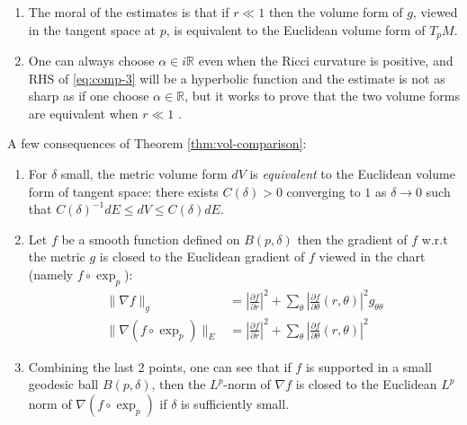\begin{remark}
\label{rem:on-vol-comp}
\begin{enumerate}
\item The moral of the estimates is that if \(r\ll 1\) then the volume form of \(g\),
viewed in the tangent space at \(p\), is equivalent to the Euclidean volume form of \(T_pM\).
\item One can always choose \(\alpha\in i \mathbb{R}\) even when the Ricci curvature is
positive, and RHS of \eqref{eq:comp-3} will be a hyperbolic function and the estimate is
not as sharp as if one choose \(\alpha\in \mathbb{R}\), but it works to prove that
the two volume forms are equivalent when \(r \ll 1\) .
\end{enumerate}
\end{remark}

\begin{remark}
\label{rem:cor-vol-comp}
A few consequences of Theorem \ref{thm:vol-comparison}:
\begin{enumerate}
\item For \(\delta\) small, the metric volume form \(dV\) is \emph{equivalent} to the
Euclidean volume form of tangent space: there exists \(C(\delta)>0\) converging to \(1\) as \(\delta \to 0\) such that \(C(\delta)^{-1}dE \leq  dV \leq C(\delta) dE\).
\item Let \(f\) be a smooth function defined on \(B(p,\delta)\) then the gradient of \(f\) w.r.t the metric \(g\) is closed to the Euclidean gradient of \(f\) viewed in
the chart (namely \(f\circ \exp_p\)):
\begin{equation*}
\begin{split}
\|\nabla f\|_g &= \left|\frac{\partial f}{\partial r}\right|^2 + \sum_\theta \left|\frac{\partial f}{\partial \theta}(r,\theta)\right|^2 g_{\theta\theta}\\ 
\|\nabla (f\circ\exp_p)\|_E &= \left|\frac{\partial f}{\partial r}\right|^2 + \sum_\theta \left|\frac{\partial f}{\partial \theta}(r,\theta)\right|^2
\end{split}   
\end{equation*}
\item Combining the last 2 points, one can see that if \(f\) is supported in a small
geodesic ball \(B(p,\delta)\), then the \(L^p\)-norm of \(\nabla f\) is closed to
the Euclidean \(L^p\) norm of \(\nabla (f\circ \exp_p)\) if \(\delta\) is
sufficiently small.
\end{enumerate}
\end{remark}



